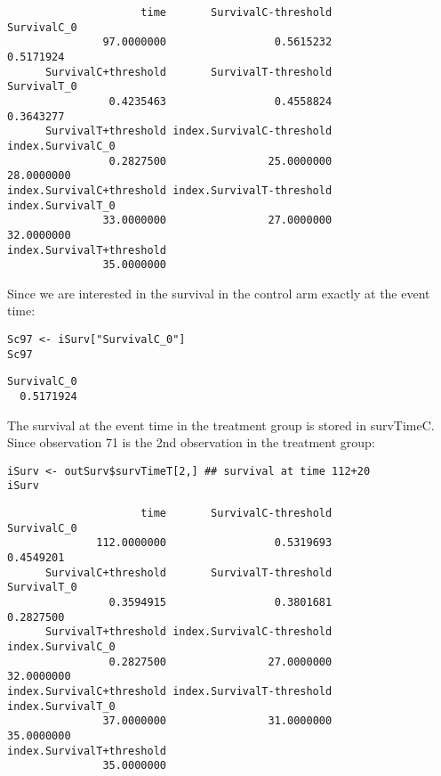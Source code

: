 \documentclass[12pt]{article}
\begin{document}
\begin{verbatim}
                     time       SurvivalC-threshold               SurvivalC_0 
               97.0000000                 0.5615232                 0.5171924 
      SurvivalC+threshold       SurvivalT-threshold               SurvivalT_0 
                0.4235463                 0.4558824                 0.3643277 
      SurvivalT+threshold index.SurvivalC-threshold         index.SurvivalC_0 
                0.2827500                25.0000000                28.0000000 
index.SurvivalC+threshold index.SurvivalT-threshold         index.SurvivalT_0 
               33.0000000                27.0000000                32.0000000 
index.SurvivalT+threshold 
               35.0000000
\end{verbatim}

Since we are interested in the survival in the control arm exactly at the event time:
\lstset{language=r,label= ,caption= ,captionpos=b,numbers=none}
\begin{lstlisting}
Sc97 <- iSurv["SurvivalC_0"] 
Sc97
\end{lstlisting}

\begin{verbatim}
SurvivalC_0 
  0.5171924
\end{verbatim}

The survival at the event time in the treatment group is stored in
survTimeC. Since observation 71 is the 2nd observation in the treatment
group:
\lstset{language=r,label= ,caption= ,captionpos=b,numbers=none}
\begin{lstlisting}
iSurv <- outSurv$survTimeT[2,] ## survival at time 112+20
iSurv
\end{lstlisting}

\begin{verbatim}
                     time       SurvivalC-threshold               SurvivalC_0 
              112.0000000                 0.5319693                 0.4549201 
      SurvivalC+threshold       SurvivalT-threshold               SurvivalT_0 
                0.3594915                 0.3801681                 0.2827500 
      SurvivalT+threshold index.SurvivalC-threshold         index.SurvivalC_0 
                0.2827500                27.0000000                32.0000000 
index.SurvivalC+threshold index.SurvivalT-threshold         index.SurvivalT_0 
               37.0000000                31.0000000                35.0000000 
index.SurvivalT+threshold 
               35.0000000
\end{verbatim}
\end{document}
